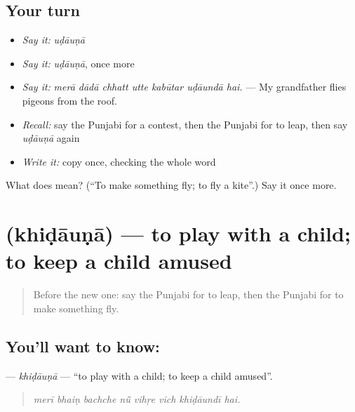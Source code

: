 \subsection*{Your turn}
\begin{itemize}
\raggedright
  \item \emph{Say it:} \emph{uḍāuṇā}
  \item \emph{Say it:} \emph{uḍāuṇā}, once more
  \item \emph{Say it:} \emph{merā dādā chhatt utte kabūtar uḍāundā hai.} — My grandfather flies pigeons from the roof.
  \item \emph{Recall:} say the Punjabi for a contest, then the Punjabi for to leap, then say \emph{uḍāuṇā} again
  \item \emph{Write it:} copy \textbf{} once, checking the whole word
\end{itemize}

\begin{tcolorbox}[breakable,colback=teal!4,colframe=teal!35!black,title={Before you move on}]
What does  mean? (\textquotedblleft{}To make something fly; to fly a kite\textquotedblright{}.) Say it once more.
\end{tcolorbox}
\section[\texorpdfstring{\pa{ਖਿਡਾਉਣਾ} (khiḍāuṇā)}{ਖਿਡਾਉਣਾ (khiḍāuṇā)}]{ (khiḍāuṇā) — to play with a child; to keep a child amused}

\label{lesson:PA-C353-khidauna}



\begin{quote}
Before the new one: say the Punjabi for to leap, then the Punjabi for to make something fly.
\end{quote}

\subsection*{You'll want to know: }
\textbf{} — \emph{khiḍāuṇā} — \textquotedblleft{}to play with a child; to keep a child amused\textquotedblright{}.

\begin{quote}
       
\end{quote}

\begin{quote}
\emph{merī bhaiṇ bachche nū̃ vihṛe vich khiḍāundī hai.}
\end{quote}

